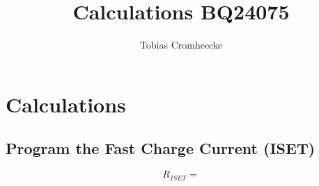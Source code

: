 \documentclass{article}
\title{Calculations BQ24075}
\author{Tobias Cromheecke}
\begin{document}
	\maketitle
	
	\section{Calculations}
	\subsection{Program the Fast Charge Current (ISET)}
	\[ R_{ISET} =  \]

	
\end{document}
